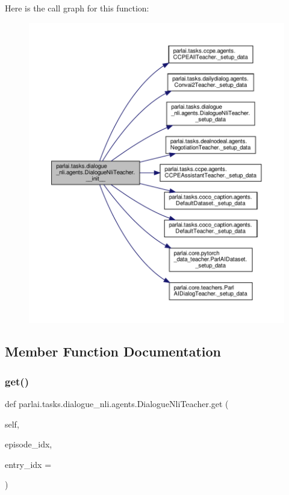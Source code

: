Here is the call graph for this function\+:
\nopagebreak
\begin{figure}[H]
\begin{center}
\leavevmode
\includegraphics[width=350pt]{classparlai_1_1tasks_1_1dialogue__nli_1_1agents_1_1DialogueNliTeacher_ab6931a1fbc88ffc407f35ba72cc44b76_cgraph}
\end{center}
\end{figure}


\subsection{Member Function Documentation}
\mbox{\label{classparlai_1_1tasks_1_1dialogue__nli_1_1agents_1_1DialogueNliTeacher_aa3dfbefa7098aa0336896dd7ac5698b9}} 
\subsubsection{\texorpdfstring{get()}{get()}}
{\footnotesize\ttfamily def parlai.\+tasks.\+dialogue\+\_\+nli.\+agents.\+Dialogue\+Nli\+Teacher.\+get (\begin{DoxyParamCaption}\item[{}]{self,  }\item[{}]{episode\+\_\+idx,  }\item[{}]{entry\+\_\+idx = {} }\end{DoxyParamCaption})}



